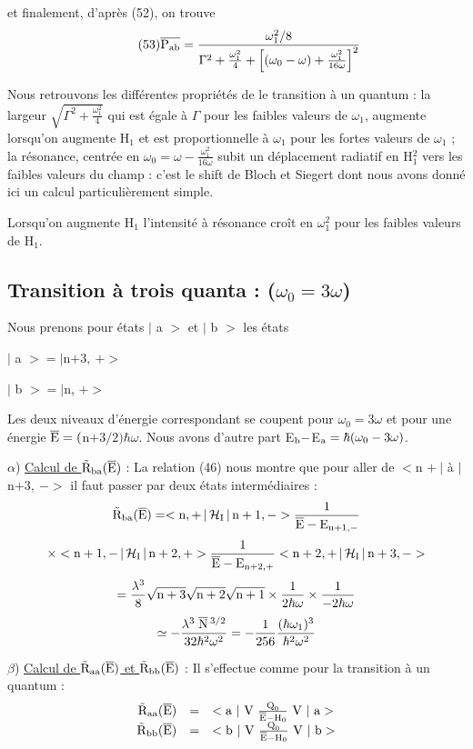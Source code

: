et finalement, d'après (52), on trouve
\[
\tag{53}\overline{\text{P}_{\text{ab}}}=\frac{\omega_1^2/8}{\Gamma^2+\frac{\omega_1^2}{4}+
\left[(\omega_0-\omega)+\frac{\omega_1^2}{16\omega}\right]^2}
\]

Nous retrouvons les différentes propriétés de le transition à un quantum : la
largeur $\sqrt{\Gamma^2+\frac{\omega_1^2}{4}}$ qui est égale à $\Gamma$ pour les faibles valeurs de $\omega_1$,
augmente lorsqu'on augmente H$_1$ et est proportionnelle à $\omega_1$ pour les fortes valeurs de $\omega_1$ ;
la résonance, centrée en $\omega_0=\omega-\frac{\omega_1^2}{16\omega}$ subit un déplacement radiatif en
H$_1^2$ vers les faibles valeurs du champ : c'est le shift de Bloch et Siegert
dont nous avons donné ici un calcul particulièrement simple.

Lorsqu'on augmente H$_1$ l'intensité à résonance croît en $\omega_1^2$ pour
les faibles valeurs de H$_1$.

\subsection{Transition à trois quanta : ($\omega_0=3\omega$)}%
Nous prenons pour états $|$ a $>$ et $|$ b $>$ les états
\begin{center}
$|$ a $>=|$n$+3,\ +>$

$|$ b $>=|$n, $+>$
\end{center}
Les deux niveaux d'énergie correspondant se coupent pour $\omega_0=3\omega$ et pour une
énergie $\overline{\text{E}}=($n$+3/2)\hbar\omega$.
Nous avons d'autre part E$_{\text{b}}-$E$_{\text{a}}=\hbar(\omega_0-3\omega)$.

$\alpha$) \ul{Calcul de $\tilde{\text{R}}_{\text{ba}}(\overline{\text{E}})$} :
La relation (46) nous montre que pour aller de $<$n $+\ |$ à $|$ n$+3,\ ->$
il faut passer par deux états intermédiaires :
\[
\tilde{\text{R}}_{\text{ba}}(\overline{\text{E}})=<\text{n},+\,|\,\mathcal{H}_{\text{I}}\,|\,\text{n}+1,->\frac{1}{\overline{\text{E}}-\text{E}_{\text{n}+1,-}}
\]
\[
\times
<\text{n}+1,-\,|\,\mathcal{H}_{\text{I}}\,|\,\text{n}+2,+>\frac{1}{\overline{\text{E}}-\text{E}_{\text{n}+2,+}}
<\text{n}+2,+\,|\,\mathcal{H}_{\text{I}}\,|\,\text{n}+3,->
\]
\[
=\frac{\lambda^3}{8}\sqrt{\text{n}+3}\sqrt{\text{n}+2}\sqrt{\text{n}+1}\times\frac{1}{2\hbar\omega}
\times\frac{1}{-2\hbar\omega}
\]
\[
\simeq-\frac{\lambda^3\;\overline{\text{N}}\,^{3/2}}{32\hbar^2\omega^2}=-\frac{1}{256}\frac{(\hbar\omega_1)^3}{\hbar^2\omega^2}
\]

$\beta$) \ul{Calcul de $\tilde{\text{R}}_{\text{aa}}(\overline{\text{E}})$ et $\tilde{\text{R}}_{\text{bb}}(\overline{\text{E}})$} :
Il s'effectue comme pour la transition à un quantum :
\[
\begin{array}{rcl}
\tilde{\text{R}}_{\text{aa}}(\overline{\text{E}}) & = & 
<\text{a }|\text{ V }\frac{\text{Q}_0}{\overline{\text{E}}-\text{H}_0}\text{ V }|\text{ a}> \\
\tilde{\text{R}}_{\text{bb}}(\overline{\text{E}}) & = & 
<\text{b }|\text{ V }\frac{\text{Q}_0}{\overline{\text{E}}-\text{H}_0}\text{ V }|\text{ b}> \end{array}
\]


